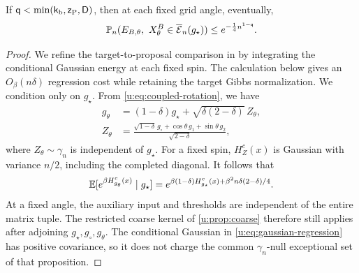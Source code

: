 \begin{lemma}\label{u:lem:transfer}
If $\mathsf{q}<\min(\mathsf{k}_{\rm b},\mathsf{z}_{\rm P},\mathsf{D})$, then at each fixed
grid angle, eventually,
\begin{equation}\label{u:eq:boundary-transfer}
 \mathbb P_n(E_{B,\theta},\ X_\theta^B\in\overline{\mathcal E}_n(g_\star))
                   \le e^{-\frac14 n^{1-\mathsf{q}}}.
\end{equation}
\end{lemma}

\begin{proof}
We refine the target-to-proposal comparison in
\cite[Section~6, proof of Proposition~7]{oai-typical-upper} by integrating
the conditional Gaussian energy at each fixed spin. The calculation
below gives an $O_\beta(n\delta)$ regression cost while retaining the
target Gibbs normalization.
We condition only on $g_\star$. From \eqref{u:eq:coupled-rotation}, we have
\begin{equation}\label{u:eq:gaussian-regression}
 \begin{split}
 g_\theta&=(1-\delta)g_\star+\sqrt{\delta(2-\delta)}\,Z_\theta,\\
 Z_\theta&=\frac{\sqrt{1-\delta}\,g_\circ
                    +\cos\theta\,g_1+\sin\theta\,g_2}{\sqrt{2-\delta}},
 \end{split}
\end{equation}
where $Z_\theta\sim\gamma_n$ is independent of $g_\star$. For a fixed
spin, $H^c_Z(x)$ is Gaussian with variance $n/2$, including the completed
diagonal. It follows that
\begin{equation}\label{u:eq:regression-energy-moment}
 \mathbb E[e^{\beta H^c_{g_\theta}(x)}\mid g_\star]
 =e^{\beta(1-\delta)H^c_{g_\star}(x)+\beta^2n\delta(2-\delta)/4}.
\end{equation}
At a fixed angle, the auxiliary input and thresholds are independent of
the entire matrix tuple. The restricted coarse kernel of
\cref{u:prop:coarse} therefore still applies after adjoining
$g_\star,g_\circ,g_\theta$. The conditional Gaussian in
\eqref{u:eq:gaussian-regression} has positive covariance, so it does not
charge the common $\gamma_n$-null exceptional set of that proposition.


\end{proof}
